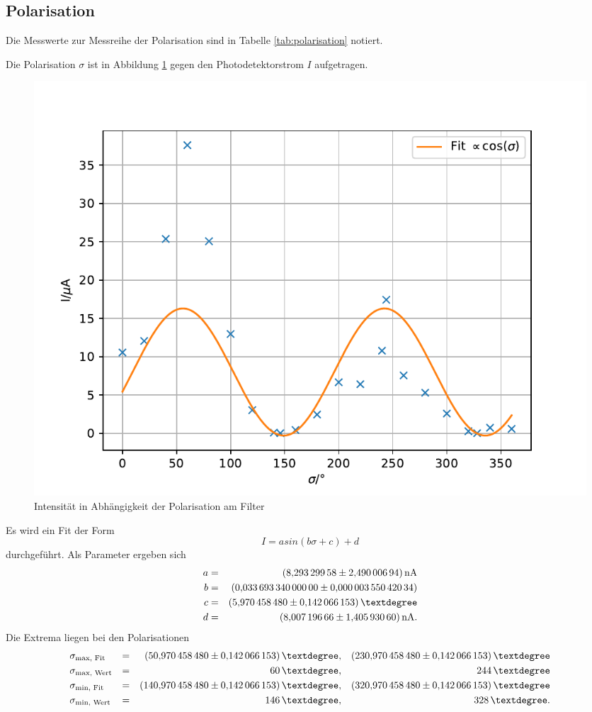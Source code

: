 \subsection{Polarisation}
Die Messwerte zur Messreihe der Polarisation sind in Tabelle \ref{tab:polarisation} notiert.

Die Polarisation $\sigma$ ist in Abbildung \ref{fig:polarisation} gegen den Photodetektorstrom $I$ aufgetragen.
\begin{figure}
  \centering
  \includegraphics[width=\textwidth]{polarisation.pdf}
  \caption{Intensität in Abhängigkeit der Polarisation am Filter}
  \label{fig:polarisation}
\end{figure}
Es wird ein Fit der Form
\begin{equation*}
  I= a sin(b \sigma +c)+d
\end{equation*}
durchgeführt.
Als Parameter ergeben sich
\begin{align*}
  a &=& \SI{ 8.29329958 \pm 2.49000694}{nA} \\
  b &=& \SI{ 0.03369334 \pm 0.00000355042034}{} \\
  c &=& \SI{ 5.97045848 \pm 0.142066153}{°} \\
  d &=& \SI{ 8.00719666 \pm 1.40593060}{nA}. \\
\end{align*}
Die Extrema liegen bei den Polarisationen
\begin{align*}
  &\sigma_{\text{max, Fit}} &=&& \SI{50.97045848 \pm 0.142066153}{°},   && \SI{230.97045848 \pm 0.142066153}{°} \\
  &\sigma_{\text{max, Wert}} &=&& \SI{ 60 }{°},                          && \SI{ 244 }{°} \\
  &\sigma_{\text{min, Fit}} &=&& \SI{140.97045848 \pm 0.142066153}{°},  && \SI{320.97045848 \pm 0.142066153}{°} \\
  &\sigma_{\text{min, Wert}} &=&& \SI{ 146 }{°},                         && \SI{ 328 }{°}. \\
\end{align*}
\FloatBarrier
